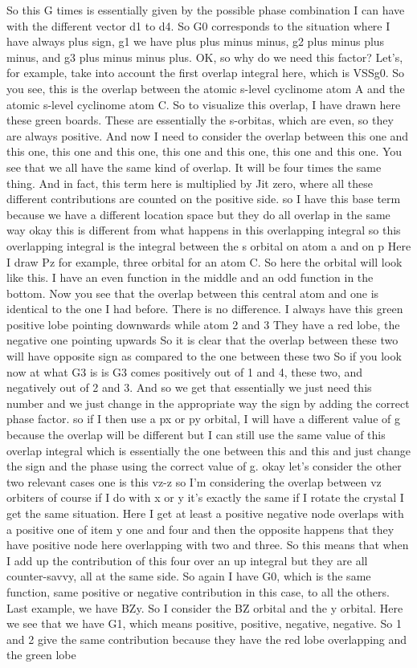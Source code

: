 So this G times is essentially given by the possible phase combination I can have with the different vector d1 to d4. So G0 corresponds to the situation where I have always plus sign, g1 we have plus plus minus minus, g2 plus minus plus minus, and g3 plus minus minus plus. OK, so why do we need this factor? Let's, for example, take into account the first overlap integral here, which is VSSg0. So you see, this is the overlap between the atomic s-level cyclinome atom A and the atomic s-level cyclinome atom C. So to visualize this overlap, I have drawn here these green boards. These are essentially the s-orbitas, which are even, so they are always positive. And now I need to consider the overlap between this one and this one, this one and this one, this one and this one, this one and this one. You see that we all have the same kind of overlap. It will be four times the same thing. And in fact, this term here is multiplied by Jit zero, where all these different contributions are counted on the positive side. so I have this base term because we have a different location space but they do all overlap in the same way okay this is different from what happens in this overlapping integral so this overlapping integral is the integral between the s orbital on atom a and on p Here I draw Pz for example, three orbital for an atom C. So here the orbital will look like this. I have an even function in the middle and an odd function in the bottom. Now you see that the overlap between this central atom and one is identical to the one I had before. There is no difference. I always have this green positive lobe pointing downwards while atom 2 and 3 They have a red lobe, the negative one pointing upwards So it is clear that the overlap between these two will have opposite sign as compared to the one between these two So if you look now at what G3 is is G3 comes positively out of 1 and 4, these two, and negatively out of 2 and 3. And so we get that essentially we just need this number and we just change in the appropriate way the sign by adding the correct phase factor. so if I then use a px or py orbital, I will have a different value of g because the overlap will be different but I can still use the same value of this overlap integral which is essentially the one between this and this and just change the sign and the phase using the correct value of g. okay let's consider the other two relevant cases one is this vz-z so I'm considering the overlap between vz orbiters of course if I do with x or y it's exactly the same if I rotate the crystal I get the same situation. Here I get at least a positive negative node overlaps with a positive one of item y one and four and then the opposite happens that they have positive node here overlapping with two and three. So this means that when I add up the contribution of this four over an up integral but they are all counter-savvy, all at the same side. So again I have G0, which is the same function, same positive or negative contribution in this case, to all the others. Last example, we have BZy. So I consider the BZ orbital and the y orbital. Here we see that we have G1, which means positive, positive, negative, negative. So 1 and 2 give the same contribution because they have the red lobe overlapping and the green lobe 